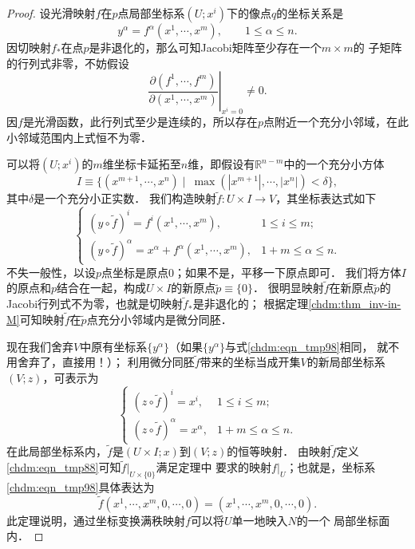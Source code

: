 \begin{proof}
    设光滑映射$f$在$p$点局部坐标系$(U;x^i)$下的像点$q$的坐标关系是
    \begin{equation*}
        y^\alpha = f^\alpha(x^1,\cdots,x^m), \qquad 1 \leqslant \alpha \leqslant n .
    \end{equation*}
    因切映射$f_{*}$在点$p$是非退化的，那么可知Jacobi矩阵至少存在一个$m\times m$的
    子矩阵的行列式非零，不妨假设
    \begin{equation*}
      \left. \frac{\partial ({f^1,\cdots,f^m})}{\partial ({x^1,\cdots,x^m})} \right|_{x^i=0} \neq 0.
    \end{equation*}
    因$f$是光滑函数，此行列式至少是连续的，所以存在$p$点附近一个充分小邻域，在此小邻域范围内上式恒不为零．
    
    可以将$(U;x^i)$的$m$维坐标卡延拓至$n$维，即假设有$\mathbb{R}^{n-m}$中的一个充分小方体
    \begin{equation*}
        I\equiv \{(x^{m+1},\cdots,x^n) \mid \ \max(|x^{m+1}|,\cdots,|x^n|) < \delta \} ,
    \end{equation*}
    其中$\delta$是一个充分小正实数．
    我们构造映射$\tilde{f}:U\times I \to V$，其坐标表达式如下
    \begin{equation}\label{chdm:eqn_tmp88}
        \begin{cases}
            (y\circ \tilde{f})^i = f^i(x^1,\cdots,x^m), & 1 \leqslant i \leqslant m; \\
            (y\circ \tilde{f})^\alpha =x^\alpha+ f^\alpha(x^1,\cdots,x^m), & 1+m \leqslant \alpha \leqslant n .
        \end{cases}
    \end{equation}
    不失一般性，以设$p$点坐标是原点$0$；如果不是，平移一下原点即可．
    我们将方体$I$的原点和$p$结合在一起，构成$U\times I $的新原点$\tilde{p}\equiv\{0\}$．
    很明显映射$\tilde{f}$在新原点$\tilde{p}$的Jacobi行列式不为零，也就是切映射$\tilde{f}_{*}$是非退化的；
    根据定理\ref{chdm:thm_inv-in-M}可知映射$\tilde{f}$在$\tilde{p}$点充分小邻域内是微分同胚．
    
    现在我们舍弃$V$中原有坐标系$\{y^\alpha\}$（如果$\{y^\alpha\}$与式\eqref{chdm:eqn_tmp98}相同，
    就不用舍弃了，直接用！）；
    利用微分同胚$\tilde{f}$带来的坐标当成开集$V$的新局部坐标系$(V;z)$，可表示为
    \begin{equation}\label{chdm:eqn_tmp98}
    \begin{cases}
        (z\circ \tilde{f})^i = x^i, & 1 \leqslant i \leqslant m; \\
        (z\circ \tilde{f})^\alpha =x^\alpha, & 1+m \leqslant \alpha \leqslant n .
    \end{cases}
    \end{equation}
    在此局部坐标系内，$\tilde{f}$是$(U\times I;x)$到$(V;z)$的恒等映射．
    由映射$\tilde{f}$定义\eqref{chdm:eqn_tmp88}可知$\tilde{f}|_{U\times\{0\}}$满足定理中
    要求的映射$f|_U$；也就是，坐标系\eqref{chdm:eqn_tmp98}具体表达为
    \begin{equation}
        \tilde{f}(x^1,\cdots,x^m,0,\cdots,0)
        = (x^1,\cdots,x^m,0,\cdots,0).
    \end{equation}
    此定理说明，通过坐标变换满秩映射$f$可以将$U$单一地映入$N$的一个
    局部坐标面内．
\end{proof}



